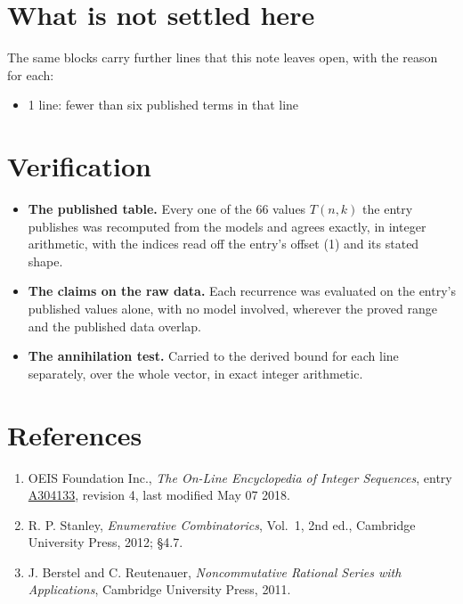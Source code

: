 \documentclass[11pt]{article}
\theoremstyle{definition}
\begin{document}
\section{What is not settled here}

The same blocks carry further lines that this note leaves open, with the reason for each:

\begin{itemize}

\item 1 line: fewer than six published terms in that line

\end{itemize}

\section{Verification}

\begin{itemize}

\item {\bfseries The published table.} Every one of the 66 values $T(n,k)$ the entry publishes was recomputed from the models and agrees exactly, in integer arithmetic, with the indices read off the entry's offset (1) and its stated shape.

\item {\bfseries The claims on the raw data.} Each recurrence was evaluated on the entry's published values alone, with no model involved, wherever the proved range and the published data overlap.

\item {\bfseries The annihilation test.} Carried to the derived bound for each line separately, over the whole vector, in exact integer arithmetic.

\end{itemize}

\section{References}

\begin{enumerate}

\item OEIS Foundation Inc., \emph{The On-Line Encyclopedia of Integer Sequences}, entry \href{https://oeis.org/A304133}{A304133}, revision 4, last modified May 07 2018.

\item R. P. Stanley, \emph{Enumerative Combinatorics}, Vol.~1, 2nd ed., Cambridge University Press, 2012; \S4.7.

\item J. Berstel and C. Reutenauer, \emph{Noncommutative Rational Series with Applications}, Cambridge University Press, 2011.

\end{enumerate}
\end{document}
